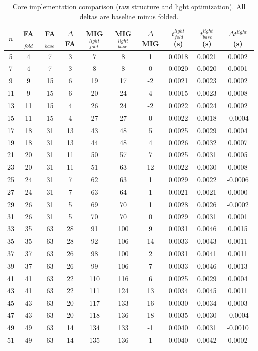 \begin{table}[t]
\centering
\caption{Core implementation comparison (raw structure and light optimization). All deltas are baseline minus folded.}
\label{tab:core_impl}
\begin{tabular}{cccccccccc}
\hline
$n$ & FA$_{fold}$ & FA$_{base}$ & $\Delta$FA & MIG$_{fold}^{light}$ & MIG$_{base}^{light}$ & $\Delta$MIG & $t_{fold}^{light}$ (s) & $t_{base}^{light}$ (s) & $\Delta t^{light}$ (s) \\
\hline
5 & 4 & 7 & 3 & 7 & 8 & 1 & 0.0018 & 0.0021 & 0.0002 \\
7 & 4 & 7 & 3 & 8 & 8 & 0 & 0.0020 & 0.0020 & 0.0001 \\
9 & 9 & 15 & 6 & 19 & 17 & -2 & 0.0021 & 0.0023 & 0.0002 \\
11 & 9 & 15 & 6 & 20 & 24 & 4 & 0.0015 & 0.0023 & 0.0008 \\
13 & 11 & 15 & 4 & 26 & 24 & -2 & 0.0022 & 0.0024 & 0.0002 \\
15 & 11 & 15 & 4 & 27 & 27 & 0 & 0.0022 & 0.0018 & -0.0004 \\
17 & 18 & 31 & 13 & 43 & 48 & 5 & 0.0025 & 0.0029 & 0.0004 \\
19 & 18 & 31 & 13 & 44 & 48 & 4 & 0.0026 & 0.0032 & 0.0007 \\
21 & 20 & 31 & 11 & 50 & 57 & 7 & 0.0025 & 0.0031 & 0.0005 \\
23 & 20 & 31 & 11 & 51 & 63 & 12 & 0.0022 & 0.0030 & 0.0008 \\
25 & 24 & 31 & 7 & 62 & 63 & 1 & 0.0029 & 0.0022 & -0.0006 \\
27 & 24 & 31 & 7 & 63 & 64 & 1 & 0.0021 & 0.0021 & 0.0000 \\
29 & 26 & 31 & 5 & 69 & 70 & 1 & 0.0028 & 0.0026 & -0.0002 \\
31 & 26 & 31 & 5 & 70 & 70 & 0 & 0.0029 & 0.0031 & 0.0001 \\
33 & 35 & 63 & 28 & 91 & 100 & 9 & 0.0031 & 0.0046 & 0.0015 \\
35 & 35 & 63 & 28 & 92 & 106 & 14 & 0.0033 & 0.0043 & 0.0011 \\
37 & 37 & 63 & 26 & 98 & 100 & 2 & 0.0031 & 0.0041 & 0.0011 \\
39 & 37 & 63 & 26 & 99 & 106 & 7 & 0.0033 & 0.0046 & 0.0013 \\
41 & 41 & 63 & 22 & 110 & 116 & 6 & 0.0025 & 0.0029 & 0.0004 \\
43 & 41 & 63 & 22 & 111 & 124 & 13 & 0.0034 & 0.0045 & 0.0011 \\
45 & 43 & 63 & 20 & 117 & 133 & 16 & 0.0030 & 0.0034 & 0.0003 \\
47 & 43 & 63 & 20 & 118 & 136 & 18 & 0.0035 & 0.0030 & -0.0004 \\
49 & 49 & 63 & 14 & 134 & 133 & -1 & 0.0040 & 0.0031 & -0.0010 \\
51 & 49 & 63 & 14 & 135 & 136 & 1 & 0.0040 & 0.0042 & 0.0002 \\
\hline
\end{tabular}
\end{table}
